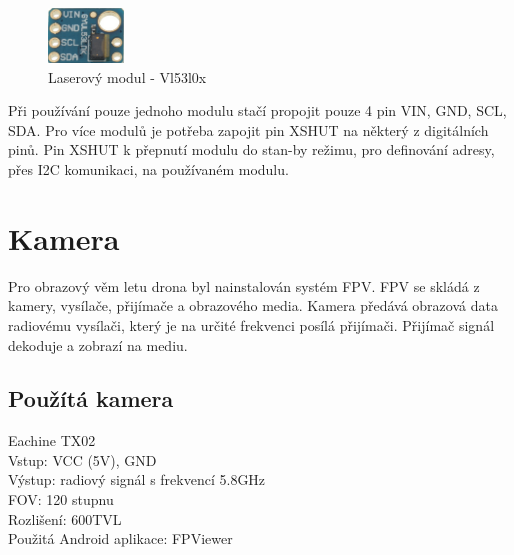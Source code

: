 \begin{figure}[h]
	\centering
	\includegraphics[width=2cm]{pictures/laser.jpg}
	\caption{Laserový modul - Vl53l0x}
\end{figure}

Při používání pouze jednoho modulu stačí propojit pouze 4 pin VIN, GND, SCL, SDA. Pro více modulů je potřeba zapojit pin XSHUT na některý z digitálních pinů. Pin XSHUT k přepnutí modulu do stan-by režimu, pro definování adresy, přes I2C komunikaci, na používaném modulu.

\section{Kamera}
Pro obrazový věm letu drona byl nainstalován systém FPV.  FPV se skládá z kamery, vysílače, přijímače a obrazového media. Kamera předává obrazová data radiovému vysílači, který je na určité frekvenci posílá přijímači. Přijímač signál dekoduje a zobrazí na mediu.

\subsection{Použítá kamera}
Eachine TX02\\
Vstup: VCC (5V), GND\\
Výstup: radiový signál s frekvencí 5.8GHz\\
FOV: 120 stupnu\\
Rozlišení: 600TVL\\
Použitá Android aplikace: FPViewer\\